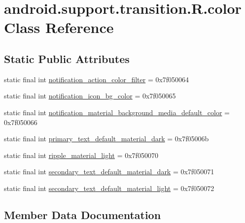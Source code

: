 \hypertarget{classandroid_1_1support_1_1transition_1_1R_1_1color}{}\section{android.\+support.\+transition.\+R.\+color Class Reference}
\label{classandroid_1_1support_1_1transition_1_1R_1_1color}
\subsection*{Static Public Attributes}
\begin{DoxyCompactItemize}
\item 
static final int \mbox{\hyperlink{classandroid_1_1support_1_1transition_1_1R_1_1color_a6a6df80fff832d185392a8e152772700}{notification\+\_\+action\+\_\+color\+\_\+filter}} = 0x7f050064
\item 
static final int \mbox{\hyperlink{classandroid_1_1support_1_1transition_1_1R_1_1color_a92b724b9c9bbb81bdfe7189cad5bd0da}{notification\+\_\+icon\+\_\+bg\+\_\+color}} = 0x7f050065
\item 
static final int \mbox{\hyperlink{classandroid_1_1support_1_1transition_1_1R_1_1color_ab93ec7da9a6eedfd03e13afd932b374f}{notification\+\_\+material\+\_\+background\+\_\+media\+\_\+default\+\_\+color}} = 0x7f050066
\item 
static final int \mbox{\hyperlink{classandroid_1_1support_1_1transition_1_1R_1_1color_ac903670bae2f357e494f5e7a96db8627}{primary\+\_\+text\+\_\+default\+\_\+material\+\_\+dark}} = 0x7f05006b
\item 
static final int \mbox{\hyperlink{classandroid_1_1support_1_1transition_1_1R_1_1color_afab65b7b77b985fd99ac16a5da6a69f9}{ripple\+\_\+material\+\_\+light}} = 0x7f050070
\item 
static final int \mbox{\hyperlink{classandroid_1_1support_1_1transition_1_1R_1_1color_a22b00f0d4637d3321e61a0c165f9cca4}{secondary\+\_\+text\+\_\+default\+\_\+material\+\_\+dark}} = 0x7f050071
\item 
static final int \mbox{\hyperlink{classandroid_1_1support_1_1transition_1_1R_1_1color_afbd843fca5d7d47368461266ae06ad27}{secondary\+\_\+text\+\_\+default\+\_\+material\+\_\+light}} = 0x7f050072
\end{DoxyCompactItemize}


\subsection{Member Data Documentation}
\mbox{\label{classandroid_1_1support_1_1transition_1_1R_1_1color_a6a6df80fff832d185392a8e152772700}} 
